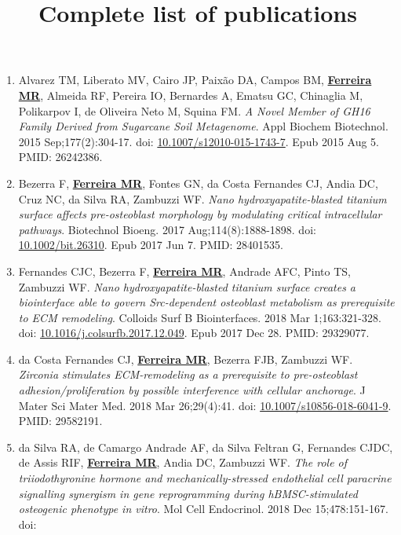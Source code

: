 \documentclass[
  letterpaper,
  DIV=11,
  numbers=noendperiod]{scrartcl}
\title{Complete list of publications}
\author{}
\date{}
\begin{document}
\maketitle


\begin{enumerate}
\def\labelenumi{\arabic{enumi}.}
\item
  Alvarez TM, Liberato MV, Cairo JP, Paixão DA, Campos BM,
  \ul{\textbf{Ferreira MR}}, Almeida RF, Pereira IO, Bernardes A, Ematsu
  GC, Chinaglia M, Polikarpov I, de Oliveira Neto M, Squina FM. \emph{A
  Novel Member of GH16 Family Derived from Sugarcane Soil Metagenome}.
  Appl Biochem Biotechnol. 2015 Sep;177(2):304-17. doi:
  \href{https://www.doi.org/10.1007/s12010-015-1743-7}{10.1007/s12010-015-1743-7}.
  Epub 2015 Aug 5. PMID: 26242386.
\item
  Bezerra F, \ul{\textbf{Ferreira MR}}, Fontes GN, da Costa Fernandes
  CJ, Andia DC, Cruz NC, da Silva RA, Zambuzzi WF. \emph{Nano
  hydroxyapatite-blasted titanium surface affects pre-osteoblast
  morphology by modulating critical intracellular pathways}. Biotechnol
  Bioeng. 2017 Aug;114(8):1888-1898. doi:
  \href{https://www.doi.org/10.1002/bit.26310}{10.1002/bit.26310}. Epub
  2017 Jun 7. PMID: 28401535.
\item
  Fernandes CJC, Bezerra F, \ul{\textbf{Ferreira MR}}, Andrade AFC,
  Pinto TS, Zambuzzi WF. \emph{Nano hydroxyapatite-blasted titanium
  surface creates a biointerface able to govern Src-dependent osteoblast
  metabolism as prerequisite to ECM remodeling}. Colloids Surf B
  Biointerfaces. 2018 Mar 1;163:321-328. doi:
  \href{https://www.doi.org/10.1016/j.colsurfb.2017.12.049}{10.1016/j.colsurfb.2017.12.049}.
  Epub 2017 Dec 28. PMID: 29329077.
\item
  da Costa Fernandes CJ, \ul{\textbf{Ferreira MR}}, Bezerra FJB,
  Zambuzzi WF. \emph{Zirconia stimulates ECM-remodeling as a
  prerequisite to pre-osteoblast adhesion/proliferation by possible
  interference with cellular anchorage}. J Mater Sci Mater Med. 2018 Mar
  26;29(4):41. doi:
  \href{https://www.doi.org/10.1007/s10856-018-6041-9}{10.1007/s10856-018-6041-9}.
  PMID: 29582191.
\item
  da Silva RA, de Camargo Andrade AF, da Silva Feltran G, Fernandes
  CJDC, de Assis RIF, \ul{\textbf{Ferreira MR}}, Andia DC, Zambuzzi WF.
  \emph{The role of triiodothyronine hormone and mechanically-stressed
  endothelial cell paracrine signalling synergism in gene reprogramming
  during hBMSC-stimulated osteogenic phenotype in vitro}. Mol Cell
  Endocrinol. 2018 Dec 15;478:151-167. doi:

\end{enumerate}
\end{document}
